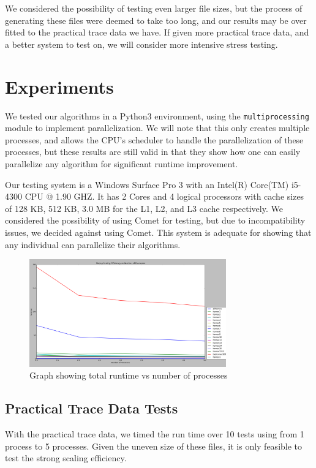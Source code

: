\documentclass{acmtog} %
\begin{document}
	We considered the possibility of testing even larger file sizes, but the process of generating these files were deemed to take too long, and our results may be over fitted to the practical trace data we have. If given more practical trace data, and a better system to test on, we will consider more intensive stress testing.
	
	
	\section{Experiments}
	We tested our algorithms in a Python3 environment, using the \texttt{multiprocessing} module to implement parallelization. We will note that this only creates multiple processes, and allows the CPU's scheduler to handle the parallelization of these processes, but these results are still valid in that they show how one can easily parallelize any algorithm for significant runtime improvement.
	
	Our testing system is a Windows Surface Pro 3 with an Intel(R) Core(TM) i5-4300 CPU @ 1.90 GHZ. It has 2 Cores and 4 logical processors with cache sizes of 128 KB, 512 KB, 3.0 MB for the L1, L2, and L3 cache respectively. We considered the possibility of using Comet for testing, but due to incompatibility issues, we decided against using Comet. This system is adequate for showing that any individual can parallelize their algorithms.
	
	
		\begin{figure}
			\centerline{\includegraphics[width=8.5cm]{img/AllTimesvsProcess}}
			\caption{Graph showing total runtime vs number of processes}
			\label{fig:runtimecomparisons}
		\end{figure}
	\subsection{Practical Trace Data Tests}

	With the practical trace data, we timed the run time over 10 tests using from 1 process to 5 processes. Given the uneven size of these files, it is only feasible to test the strong scaling efficiency.
\end{document}
